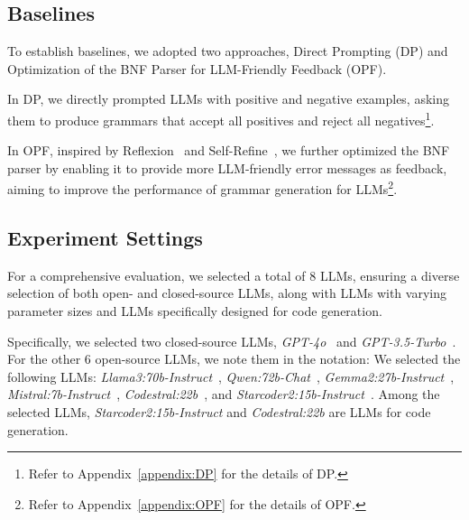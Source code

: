 
\subsection{Baselines}
To establish baselines, we adopted two approaches, Direct Prompting (DP) and Optimization of the BNF Parser for LLM-Friendly Feedback (OPF).

In DP, we directly prompted LLMs with positive and negative examples, asking them to produce grammars that accept all positives and reject all negatives\footnote{Refer to Appendix~\ref{appendix:DP} for the details of DP.}.

In OPF, inspired by Reflexion~\cite{shinn2023reflexion} and Self-Refine~\cite{madaan2023selfrefine}, we further optimized the BNF parser by enabling it to provide more LLM-friendly error messages as feedback, aiming to improve the performance of grammar generation for LLMs\footnote{Refer to Appendix~\ref{appendix:OPF} for the details of OPF.}. 

\subsection{Experiment Settings}
For a comprehensive evaluation, we selected a total of 8 LLMs, ensuring a diverse selection of both open- and closed-source LLMs, along with LLMs with varying parameter sizes and LLMs specifically designed for code generation. 

Specifically, we selected two closed-source LLMs, \textit{GPT-4o}~\cite{openai2024gpt4technicalreport} and \textit{GPT-3.5-Turbo}~\cite{brown2020languagemodelsfewshotlearners}. For the other 6 open-source LLMs, we note them in the notation:  We selected the following LLMs: \textit{Llama3:70b-Instruct}~\cite{grattafiori2024llama3herdmodels}, \textit{Qwen:72b-Chat}~\cite{bai2023qwentechnicalreport}, \textit{Gemma2:27b-Instruct}~\cite{gemmateam2024gemma2improvingopen}, \textit{Mistral:7b-Instruct}~\cite{jiang2023mistral7b}, \textit{Codestral:22b}~\cite{mistral2024codestral}, and \textit{Starcoder2:15b-Instruct}~\cite{lozhkov2024starcoder2stackv2}. Among the selected LLMs, \textit{Starcoder2:15b-Instruct} and \textit{Codestral:22b} are LLMs for code generation.

